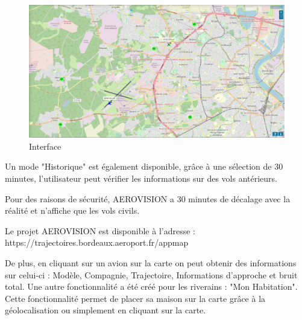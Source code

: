\begin{figure}[hbt!]
  \centering
  \includegraphics[width=17cm]{Images/aerovision.png}\newline
  \caption{Interface}
  \label{fig:interfaceaerovision}
\end{figure}

Un mode "Historique" est également disponible, grâce à une sélection de 30 minutes, l'utilisateur peut vérifier les informations sur des vols antérieurs.

Pour des raisons de sécurité, AEROVISION a 30 minutes de décalage avec la réalité et n'affiche que les vols civils.

Le projet AEROVISION est disponible à l'adresse : https://trajectoires.bordeaux.aeroport.fr/appmap\newline

De plus, en cliquant sur un avion sur la carte on peut obtenir des informations sur celui-ci : Modèle, Compagnie, Trajectoire, Informations d'approche et bruit total.
Une autre fonctionnalité a été créé pour les riverains : "Mon Habitation". Cette fonctionnalité permet de placer sa maison sur la carte grâce à la géolocalisation ou simplement en cliquant sur la carte.

